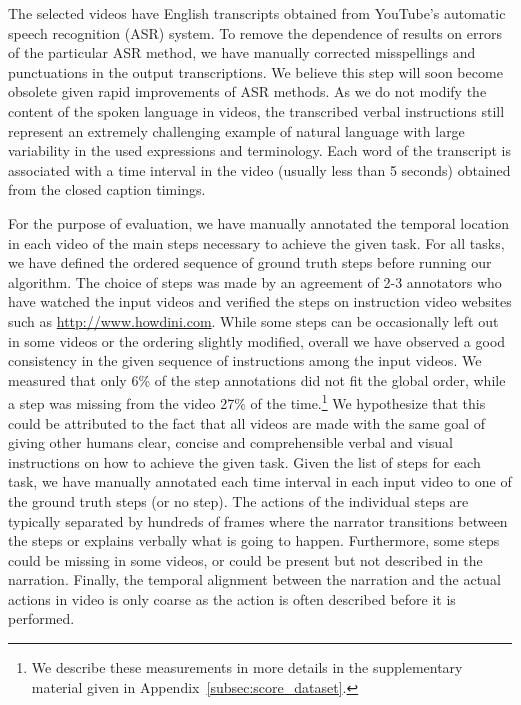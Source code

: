 \documentclass[10pt,twocolumn,letterpaper]{article}
\begin{document}
The selected videos have English transcripts obtained from YouTube's automatic speech recognition (ASR) system.
To remove the dependence of results on errors of the particular ASR method, we have manually corrected misspellings and punctuations in the output transcriptions.
We believe this step will soon become obsolete given rapid improvements of ASR methods. 
As we do not modify the content of the spoken language in videos, the transcribed verbal instructions still represent an extremely challenging example of natural language with large variability in the used expressions and terminology.
Each word of the transcript is associated with a time interval in the video (usually less than 5 seconds) obtained from the closed caption timings.

For the purpose of evaluation, we have manually annotated the temporal location in each video of the main steps necessary to achieve the given task.
For all tasks, we have defined the ordered sequence of ground truth steps before running our algorithm.
The choice of steps was made by an agreement of 2-3 annotators who have watched the input videos and verified the steps on instruction video websites such as \url{http://www.howdini.com}.
 While some steps can be occasionally left out in some videos or the ordering slightly modified, overall we have observed a good consistency 
 in the given sequence of instructions among the input videos.
We measured that only 6\% of the step annotations did not fit the global order, while a step was missing from the video 27\% of the time.\footnote{We describe these measurements in more details in the supplementary material given in Appendix~\ref{subsec:score_dataset}.}
We hypothesize that this could be attributed to the fact that all videos are made with the same goal of giving other humans clear, concise and comprehensible verbal and visual instructions on how to achieve the given task.  
Given the list of steps for each task, we have manually annotated each time interval in each input video to one of the ground truth steps (or no step).
The actions of the individual steps are typically separated by hundreds of frames where the narrator transitions between the steps or explains verbally what is going to happen.  
Furthermore, some steps could be missing in some videos, or could be present but not described in the narration.  Finally, the temporal alignment between the narration and the actual actions in video is only coarse as the action is often described before it is performed. 
\end{document}
